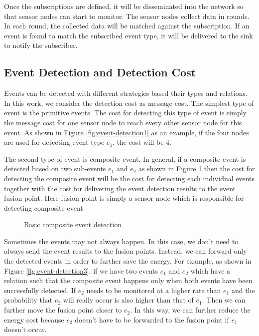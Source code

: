 Once the subscriptions are defined, it will be disseminated into the network so that sensor nodes can start to monitor. The sensor nodes collect data in rounds. In each round, the collected data will be matched against the subscription. If an event is found to match the subscribed event type, it will be delivered to the sink to notify the subscriber.

\subsection{Event Detection and Detection Cost}
Events can be detected with different strategies based their types and relations. In this work, we consider the detection cost as message cost. The simplest type of event is the primitive events. The cost for detecting this type of event is simply the message cost for one sensor node to reach every other sensor node for this event. As shown in Figure \ref{fig:event-detection1} as an example, if the four nodes are used for detecting event type \(e_1\), the cost will be 4.

The second type of event is composite event. In general, if a composite event is detected based on two sub-events \(e_1\) and \(e_2\) as shown in Figure \ref{fig:event-detection2} then the cost for detecting the composite event will be the cost for detecting each individual events together with the cost for delivering the event detection results to the event fusion point. Here fusion point is simply a sensor node which is responsible for detecting composite event

\begin{figure}
\centering
{}
\caption{Basic composite event detection}
\label{fig:event-detection2}
\end{figure}

Sometimes the events may not always happen. In this case, we don't need to always send the event results to the fusion points. Instead, we can forward only the detected events in order to further save the energy. For example, as shown in Figure \ref{fig:event-detection3}, if we have two events \(e_1\) and \(e_2\) which have a relation such that the composite event happens only when both events have been successfully detected. If \(e_2\) needs to be monitored at a higher rate than \(e_1\) and the probability that \(e_2\) will really occur is also higher than that of \(e_1\). Then we can further move the fusion point closer to \(e_2\). In this way, we can further reduce the energy cost because \(e_2\) doesn't have to be forwarded to the fusion point if \(e_1\) doesn't occur.

